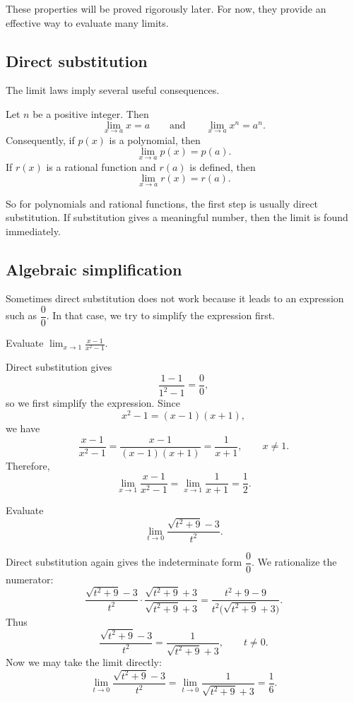 \begin{remark}
These properties will be proved rigorously later. For now, they provide an effective way to evaluate many limits.
\end{remark}

\subsection{Direct substitution}

The limit laws imply several useful consequences.

\begin{proposition}
Let \(n\) be a positive integer. Then
\[
\lim_{x\to a}x=a
\qquad \text{and} \qquad
\lim_{x\to a}x^{n}=a^{n}.
\]
Consequently, if \(p(x)\) is a polynomial, then
\[
\lim_{x\to a}p(x)=p(a).
\]
If \(r(x)\) is a rational function and \(r(a)\) is defined, then
\[
\lim_{x\to a}r(x)=r(a).
\]
\end{proposition}

So for polynomials and rational functions, the first step is usually direct substitution. If substitution gives a meaningful number, then the limit is found immediately.

\subsection{Algebraic simplification}

Sometimes direct substitution does not work because it leads to an expression such as \(\dfrac{0}{0}\). In that case, we try to simplify the expression first.

\begin{example}
Evaluate
\(\displaystyle
\lim_{x\to 1}\frac{x-1}{x^{2}-1}.
\)
\end{example}

\begin{solution}
Direct substitution gives
\[
\frac{1-1}{1^{2}-1}=\frac{0}{0},
\]
so we first simplify the expression. Since
\[
x^{2}-1=(x-1)(x+1),
\]
we have
\[
\frac{x-1}{x^{2}-1}
=
\frac{x-1}{(x-1)(x+1)}
=
\frac{1}{x+1},
\qquad x\ne 1.
\]
Therefore,
\[
\lim_{x\to 1}\frac{x-1}{x^{2}-1}
=
\lim_{x\to 1}\frac{1}{x+1}
=
\frac{1}{2}.
\]
\end{solution}

\begin{example}
Evaluate
\[
\lim_{t\to 0}\frac{\sqrt{t^{2}+9}-3}{t^{2}}.
\]
\end{example}

\begin{solution}
Direct substitution again gives the indeterminate form \(\dfrac{0}{0}\). We rationalize the numerator:
\[
\frac{\sqrt{t^{2}+9}-3}{t^{2}}
\cdot
\frac{\sqrt{t^{2}+9}+3}{\sqrt{t^{2}+9}+3}
=
\frac{t^{2}+9-9}{t^{2}\bigl(\sqrt{t^{2}+9}+3\bigr)}.
\]
Thus
\[
\frac{\sqrt{t^{2}+9}-3}{t^{2}}
=
\frac{1}{\sqrt{t^{2}+9}+3},
\qquad t\ne 0.
\]
Now we may take the limit directly:
\[
\lim_{t\to 0}\frac{\sqrt{t^{2}+9}-3}{t^{2}}
=
\lim_{t\to 0}\frac{1}{\sqrt{t^{2}+9}+3}
=
\frac{1}{6}.
\]
\end{solution}

